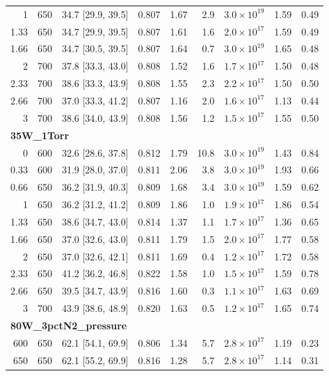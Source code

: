\begin{longtable}{rrlrrrrrr}
1 & 650 & 34.7 [29.9, 39.5] & 0.807 & 1.67 & 2.9 & $3.0\times10^{19}$ & 1.59 & 0.49 \\
1.33 & 650 & 34.7 [29.9, 39.5] & 0.807 & 1.61 & 1.6 & $2.0\times10^{17}$ & 1.59 & 0.49 \\
1.66 & 650 & 34.7 [30.5, 39.5] & 0.807 & 1.64 & 0.7 & $3.0\times10^{19}$ & 1.65 & 0.48 \\
2 & 700 & 37.8 [33.3, 43.0] & 0.808 & 1.52 & 1.6 & $1.7\times10^{17}$ & 1.50 & 0.48 \\
2.33 & 700 & 38.6 [33.3, 43.9] & 0.808 & 1.55 & 2.3 & $2.2\times10^{17}$ & 1.50 & 0.50 \\
2.66 & 700 & 37.0 [33.3, 41.2] & 0.807 & 1.16 & 2.0 & $1.6\times10^{17}$ & 1.13 & 0.44 \\
3 & 700 & 38.6 [34.0, 43.9] & 0.808 & 1.56 & 1.2 & $1.5\times10^{17}$ & 1.55 & 0.50 \\
\midrule\multicolumn{9}{l}{\textbf{35W\_1Torr}}\\
0 & 600 & 32.6 [28.6, 37.8] & 0.812 & 1.79 & 10.8 & $3.0\times10^{19}$ & 1.43 & 0.84 \\
0.33 & 600 & 31.9 [28.0, 37.0] & 0.811 & 2.06 & 3.8 & $3.0\times10^{19}$ & 1.93 & 0.66 \\
0.66 & 650 & 36.2 [31.9, 40.3] & 0.809 & 1.68 & 3.4 & $3.0\times10^{19}$ & 1.59 & 0.62 \\
1 & 650 & 36.2 [31.2, 41.2] & 0.809 & 1.86 & 1.0 & $1.9\times10^{17}$ & 1.86 & 0.54 \\
1.33 & 650 & 38.6 [34.7, 43.0] & 0.814 & 1.37 & 1.1 & $1.7\times10^{17}$ & 1.36 & 0.65 \\
1.66 & 650 & 37.0 [32.6, 43.0] & 0.811 & 1.79 & 1.5 & $2.0\times10^{17}$ & 1.77 & 0.58 \\
2 & 650 & 37.0 [32.6, 42.1] & 0.811 & 1.69 & 0.4 & $1.2\times10^{17}$ & 1.72 & 0.58 \\
2.33 & 650 & 41.2 [36.2, 46.8] & 0.822 & 1.58 & 1.0 & $1.5\times10^{17}$ & 1.59 & 0.78 \\
2.66 & 650 & 39.5 [34.7, 43.9] & 0.816 & 1.60 & 0.3 & $1.1\times10^{17}$ & 1.63 & 0.69 \\
3 & 700 & 43.9 [38.6, 48.9] & 0.820 & 1.63 & 0.5 & $1.2\times10^{17}$ & 1.65 & 0.74 \\
\midrule\multicolumn{9}{l}{\textbf{80W\_3pctN2\_pressure}}\\
600 & 650 & 62.1 [54.1, 69.9] & 0.806 & 1.34 & 5.7 & $2.8\times10^{17}$ & 1.19 & 0.23 \\
650 & 650 & 62.1 [55.2, 69.9] & 0.816 & 1.28 & 5.7 & $2.8\times10^{17}$ & 1.14 & 0.31 \\

\end{longtable}
